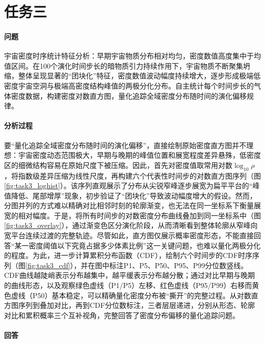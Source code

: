 \documentclass[12pt,a4paper]{article}
\begin{document}
\section{任务三}

\paragraph{问题}
宇宙密度时序统计特征分析：早期宇宙物质分布相对均匀，密度数值高度集中于均值区间。在100个演化时间步长的暗物质引力持续作用下，宇宙物质不断聚集坍缩，整体呈现显著的``团块化''特征，密度数值波动幅度持续增大，逐步形成极端低密度宇宙空洞与极端高密度结构峰值的两极分化分布。自主统计每个时间步长的气体密度数据，构建密度对数直方图，量化追踪全域密度分布随时间的演化偏移规律。

\paragraph{分析过程}
要``量化追踪全域密度分布随时间的演化偏移''，直接绘制原始密度直方图并不理想：宇宙密度动态范围极大，早期与晚期的峰值位置和展宽程度差异悬殊，低密度区的细微结构容易在原始尺度下被压缩。因此，首先对密度值取常用对数$\log_{10}\rho$，将指数级差异压缩为线性尺度，再构建六个代表性时间步的对数直方图序列（图\ref{fig:task3_loghist}）。该序列直观展示了分布从尖锐窄峰逐步展宽为扁平平台的``峰值降低、尾部增厚''现象，初步验证了``团块化''导致波动幅度增大的假设。然而，分图并列的方式难以精确对比相邻时刻的轮廓渐变，也无法在同一坐标系下衡量展宽的相对幅度。于是，将所有时间步的对数密度分布曲线叠加到同一坐标系中（图\ref{fig:task3_overlay}），通过渐变色区分演化阶段，从而清晰看到整体轮廓从窄峰向宽平台连续过渡的完整轨迹。尽管如此，直方图仅展示概率密度形态，不能直接回答``某一密度阈值以下究竟占据多少体素比例''这一关键问题，也难以量化两极分化的程度。为此，进一步计算累积分布函数（CDF），绘制六个时间步的CDF时序序列（图\ref{fig:task3_cdf}），并在图中标注P1、P5、P50、P95、P99分位数竖线。CDF曲线越陡峭表示分布越集中，越平缓表示分布越分散；通过对比早期与晚期的曲线形态，以及观察绿色虚线（P1/P5）左移、红色虚线（P95/P99）右移而黄色虚线（P50）基本稳定，可以精确量化密度分布被``撕开''的完整过程。从对数直方图序列到叠加对比，再到CDF分位数标注，三者层层递进，分别从形态、轮廓对比和累积概率三个互补视角，完整回答了密度分布偏移的量化追踪问题。

\paragraph{回答}
\end{document}

